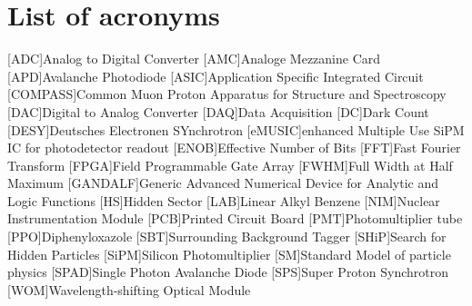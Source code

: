 \documentclass[listof=totoc,bibliography=totocnumbered,a4paper,english,12pt,twoside]{report}
\begin{document}
\onehalfspacing





\newpage
\thispagestyle{empty}
\mbox{}\newpage
{}

\thispagestyle{empty}
\mbox{}\newpage
\thispagestyle{empty}


\thispagestyle{empty}
\newpage
\thispagestyle{empty}
\mbox{}\newpage

\setcounter{page}{1}
\tableofcontents

\newpage







\appendix


\chapter{List of acronyms}
\begin{acronym}[GANDALF]
    [ADC]{Analog to Digital Converter}
    [AMC]{Analoge Mezzanine Card}
    [APD]{Avalanche Photodiode}
    [ASIC]{Application Specific Integrated Circuit}
    [COMPASS]{Common Muon Proton Apparatus for Structure and Spectroscopy}
    [DAC]{Digital to Analog Converter}
    [DAQ]{Data Acquisition}
    [DC]{Dark Count}
    [DESY]{Deutsches Electronen SYnchrotron}
    [eMUSIC]{enhanced Multiple Use SiPM IC for photodetector readout}
    [ENOB]{Effective Number of Bits}
    [FFT]{Fast Fourier Transform}
    [FPGA]{Field Programmable Gate Array}
    [FWHM]{Full Width at Half Maximum}
    [GANDALF]{Generic Advanced Numerical Device for Analytic and Logic Functions}
    [HS]{Hidden Sector}
    [LAB]{Linear Alkyl Benzene}
    [NIM]{Nuclear Instrumentation Module}
    [PCB]{Printed Circuit Board}
    [PMT]{Photomultiplier tube}
    [PPO]{Diphenyloxazole}
    [SBT]{Surrounding Background Tagger}
    [SHiP]{Search for Hidden Particles}
    [SiPM]{Silicon Photomultiplier}
    [SM]{Standard Model of particle physics}
    [SPAD]{Single Photon Avalanche Diode}
    [SPS]{Super Proton Synchrotron}
    [WOM]{Wavelength-shifting Optical Module}
\end{acronym}
\end{document}
